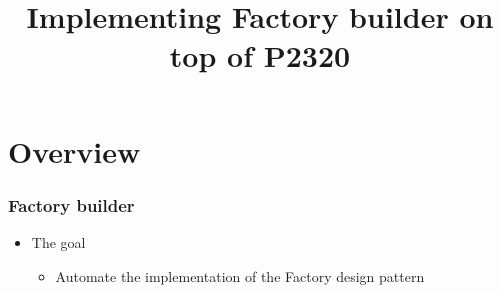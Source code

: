 \documentclass[compress,table,xcolor=table]{beamer}
\begin{document}
\title{Implementing Factory builder on top of P2320}
\section{Overview}
\frame{\titlepage}
\begin{frame}
  \frametitle{Factory builder}
  \begin{itemize}
	  \item{\LARGE{The goal}}
      \begin{itemize}
      \item{Automate the implementation of the Factory design pattern}
      \end{itemize}
  \end{itemize}
\end{frame}
\end{document}
